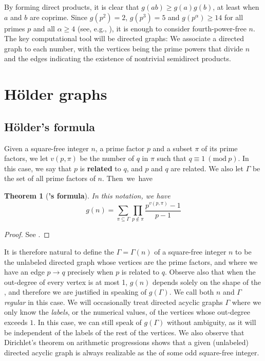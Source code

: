 \documentclass[a4paper, 12pt]{article}
\newcommand{\Mod}[1]{\ (\mathrm{mod} \ #1)}
\theoremstyle{plain}
\newtheorem{thm}{Theorem}[section]
\theoremstyle{definition}
\begin{document}
By forming direct products, it is clear that $g(ab) \ge g(a)g(b)$, at least when $a$ and $b$ are coprime. Since \mbox{$g(p^2) = 2$,} $g(p^3) = 5$ and $g(p^\alpha) \ge 14$ for all primes $p$ and all $\alpha \ge 4$ (see, e.g., \cite[Thm.~3.1]{gnumoas}), it is enough to consider fourth-power-free $n$. The key computational tool will be directed graphs: We associate a directed graph to each number, with the vertices being the prime powers that divide $n$ and the edges indicating the existence of nontrivial semidirect products.

\section{Hölder graphs}
\subsection{Hölder's formula}
Given a square-free integer $n$, a prime factor $p$ and a subset $\pi$ of its prime factors, we let $v(p, \pi)$ be the number of $q$ in $\pi$ such that $q \equiv 1 \Mod{p}$. In this case, we say that $p$ is \textbf{related} to $q$, and $p$ and $q$ are related. We also let $\Gamma$ be the set of all prime factors of $n$. \mbox{Then we have}
\begin{thm}[\textbf{'s formula}] In this notation, we have
	\begin{equation*}
		g(n) = \sum_{\pi \subseteq \Gamma} \prod_{p \notin \pi} \frac{p^{v(p, \pi)} - 1}{p - 1}
	\end{equation*}
\end{thm}
\begin{proof} See {\cite[Thm.~5.1]{gnumoas}}. \end{proof}

It is therefore natural to define the \emph{} $\Gamma = \Gamma(n)$ of a square-free integer $n$ to be the unlabeled directed graph whose vertices are the prime factors, and where we have an edge $p \rightarrow q$ precisely when $p$ is related to $q$. Observe also that when the out-degree of every vertex is at most 1, $g(n)$ depends solely on the shape of the , and therefore we are justified in speaking of $g(\Gamma).$ We call both $n$ and $\Gamma$ \emph{regular} in this case. We will occasionally treat directed acyclic graphs $\Gamma$ where we only know the \emph{labels}, or the numerical values, of the vertices whose out-degree exceeds $1$. In this case, we can still speak of $g(\Gamma)$ without ambiguity, as it will be independent of the labels of the rest of the vertices. We also observe that Dirichlet's theorem on arithmetic progressions shows that a given (unlabeled) directed acyclic graph is always realizable as the  of some odd square-free integer.
\end{document}
